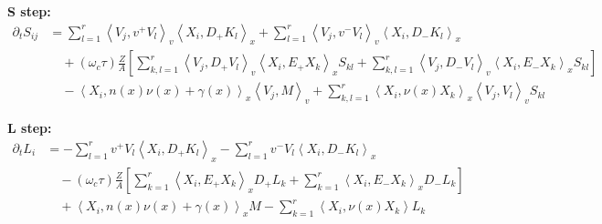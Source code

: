 \documentclass{article}
\begin{document}
\textbf{S step:}
\begin{align*}
    \partial_t S_{ij} &= \sum_{l=1}^r \left\langle V_j, v^+ V_l \right\rangle_v \left\langle X_i, D_+ K_l \right\rangle_x + \sum_{l=1}^r \left\langle V_j, v^- V_l \right\rangle_v \left\langle X_i, D_- K_l \right\rangle_x \\
                      &\quad + (\omega_c \tau) \frac{Z}{A} \left[ \sum_{k,l=1}^r \left\langle V_j, D_+ V_l \right\rangle_v \left\langle X_i, E_+ X_k \right\rangle_x S_{kl} + \sum_{k,l=1}^r \left\langle V_j, D_- V_l \right\rangle_v \left\langle X_i, E_- X_k \right\rangle_x S_{kl} \right] \\
                      &\quad - \left\langle X_i, n(x) \nu(x) +\gamma(x) \right\rangle_x \left\langle V_j, M \right\rangle_v + \sum_{k,l=1}^r \left\langle X_i, \nu(x) X_k \right\rangle_x \left\langle V_j, V_l \right\rangle_v  S_{kl}
\end{align*}

\textbf{L step:}
\begin{align*}
    \partial_t L_i &= -\sum_{l=1}^r v^+ V_l \left\langle X_i, D_+ K_l \right\rangle_x - \sum_{l=1}^r v^- V_l \left\langle X_i, D_- K_l \right\rangle_x \\
                   &\quad - (\omega_c \tau) \frac{Z}{A} \left[ \sum_{k=1}^r \left\langle X_i, E_+ X_k \right\rangle_x D_+ L_k + \sum_{k=1}^r \left\langle X_i, E_- X_k \right\rangle_x D_- L_k  \right] \\
                   &\quad + \left\langle X_i, n(x) \nu(x) + \gamma(x) \right\rangle_x M - \sum_{k=1}^r \left\langle X_i, \nu(x) X_k \right\rangle L_k
\end{align*}
\end{document}
